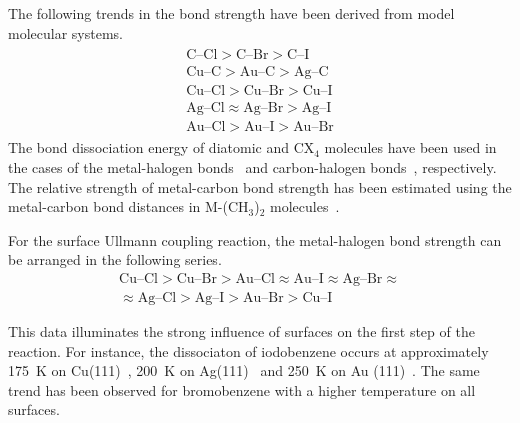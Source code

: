 \documentclass[%
 reprint,
 amsmath,amssymb,
 aps,
prb,
]{revtex4-2}
\begin{document}
The following trends in the bond strength have been derived from model molecular systems.
%
\begin{eqnarray}
\begin{split}
\text{C--Cl} > \text{C--Br} > \text{C--I} \\ 
\text{Cu--C} > \text{Au--C} > \text{Ag--C} \\
\text{Cu--Cl} > \text{Cu--Br} > \text{Cu--I}\\
\text{Ag--Cl} \approx \text{Ag--Br} > \text{Ag--I} \\
\text{Au--Cl} > \text{Au--I} > \text{Au--Br}
\end{split}
\end{eqnarray}
%
The bond dissociation energy of diatomic and CX$_4$ molecules have been used in the cases of the metal-halogen bonds~\cite{ullmann_62} and carbon-halogen bonds~\cite{ullmann_63}, respectively. The relative strength of metal-carbon bond strength has been estimated using the metal-carbon bond distances in M-(CH$_3$)$_2$ molecules~\cite{ullmann_61}.

For the surface Ullmann coupling reaction, the metal-halogen bond strength can be arranged in the following series.
%
\begin{gather*}
\text{Cu--Cl} > \text{Cu--Br} > \text{Au--Cl} \approx \text{Au--I} \approx \text{Ag--Br} \approx \\
 \approx \text{Ag--Cl} > \text{Ag--I} > \text{Au--Br} > \text{Cu--I}
\end{gather*}

This data illuminates the strong influence of surfaces on the first step of the reaction. %
For instance, the dissociaton of iodobenzene occurs at approximately 175~K on Cu(111)~\cite{sur_sci01}, 200~K on Ag(111)~\cite{sur_sci02} and 250~K on Au (111)~\cite{sur_sci03}. 
The same trend has been observed for bromobenzene with a higher temperature on all surfaces.
\end{document}
